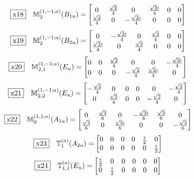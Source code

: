 \documentclass[fleqn,10pt,landscape]{jsarticle}
\begin{document}
\begin{dmath*}
\fbox{x18}\quad \mathbb{M}_{2}^{(1,-1;a)}(B_{1u})=\begin{bmatrix} 0 & \frac{\sqrt{2}}{4} & 0 & \frac{\sqrt{2} i}{4} & 0 & 0 \\ \frac{\sqrt{2}}{4} & 0 & - \frac{\sqrt{2} i}{4} & 0 & 0 & 0 \end{bmatrix}
\end{dmath*}
\begin{dmath*}
\fbox{x19}\quad \mathbb{M}_{2}^{(1,-1;a)}(B_{2u})=\begin{bmatrix} 0 & - \frac{\sqrt{2} i}{4} & 0 & \frac{\sqrt{2}}{4} & 0 & 0 \\ \frac{\sqrt{2} i}{4} & 0 & \frac{\sqrt{2}}{4} & 0 & 0 & 0 \end{bmatrix}
\end{dmath*}
\begin{dmath*}
\fbox{x20}\quad \mathbb{M}_{2,1}^{(1,-1;a)}(E_{u})=\begin{bmatrix} 0 & 0 & \frac{\sqrt{2}}{4} & 0 & 0 & - \frac{\sqrt{2} i}{4} \\ 0 & 0 & 0 & - \frac{\sqrt{2}}{4} & \frac{\sqrt{2} i}{4} & 0 \end{bmatrix}
\end{dmath*}
\begin{dmath*}
\fbox{x21}\quad \mathbb{M}_{2,2}^{(1,-1;a)}(E_{u})=\begin{bmatrix} - \frac{\sqrt{2}}{4} & 0 & 0 & 0 & 0 & - \frac{\sqrt{2}}{4} \\ 0 & \frac{\sqrt{2}}{4} & 0 & 0 & - \frac{\sqrt{2}}{4} & 0 \end{bmatrix}
\end{dmath*}
\begin{dmath*}
\fbox{x22}\quad \mathbb{M}_{0}^{(1,1;a)}(A_{1u})=\begin{bmatrix} 0 & \frac{\sqrt{3}}{6} & 0 & - \frac{\sqrt{3} i}{6} & \frac{\sqrt{3}}{6} & 0 \\ \frac{\sqrt{3}}{6} & 0 & \frac{\sqrt{3} i}{6} & 0 & 0 & - \frac{\sqrt{3}}{6} \end{bmatrix}
\end{dmath*}
\begin{dmath*}
\fbox{x23}\quad \mathbb{T}_{1}^{(a)}(A_{2u})=\begin{bmatrix} 0 & 0 & 0 & 0 & \frac{i}{2} & 0 \\ 0 & 0 & 0 & 0 & 0 & \frac{i}{2} \end{bmatrix}
\end{dmath*}
\begin{dmath*}
\fbox{x24}\quad \mathbb{T}_{1,1}^{(a)}(E_{u})=\begin{bmatrix} \frac{i}{2} & 0 & 0 & 0 & 0 & 0 \\ 0 & \frac{i}{2} & 0 & 0 & 0 & 0 \end{bmatrix}
\end{dmath*}
\end{document}
